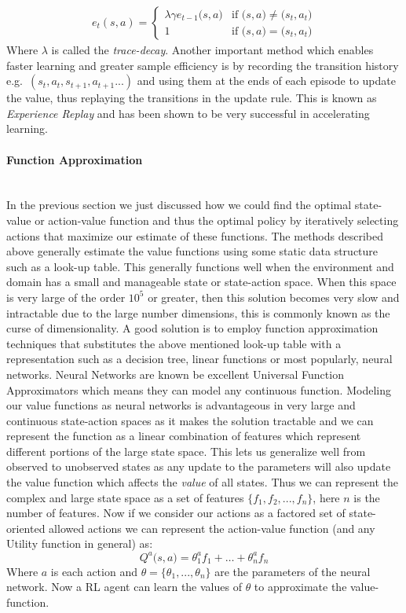 \documentclass[12pt]{extarticle}
\newcommand{\myparagraph}[1]{\paragraph{#1}\mbox{}\\ \linebreak}
\numberwithin{equation}{section}
\begin{document}
	\begin{align}
	e_t(s,a) = \begin{cases}
	\lambda\gamma e_{t-1}\big(s,a\big) & \text{if }\big(s,a\big) \neq \big(s_t,a_t\big) \\    
	1 & \text{if }\big(s,a\big) = \big(s_t,a_t\big)
	\end{cases}
	\end{align}
	Where $\lambda$ is called the \textit{trace-decay}.
	Another important method which enables faster learning and greater sample efficiency is by recording the transition history e.g.\ $(s_t,a_t,s_{t+1},a_{t+1}...)$ and using them at the ends of each episode to update the value, thus replaying the transitions in the update rule. This is known as \textit{Experience Replay} and has been shown to be very successful in accelerating learning\cite{adam2012experience}.
	
	\myparagraph{Function Approximation} \label{fn_aprrox}
	In the previous section we just discussed how we could find the optimal state-value or action-value function and thus the optimal policy by iteratively selecting actions that maximize our estimate of these functions.  The methods described above generally estimate the value functions using some static data structure such as a look-up table. This generally functions well when the environment and domain has a small and manageable state or state-action space.  When this space is very large of the order $10^5$ or greater, then this solution becomes very slow and intractable due to the large number dimensions, this is commonly known as the curse of dimensionality\cite{verleysen2005curse}. A good solution is to employ function approximation techniques that substitutes the above mentioned look-up table with a representation such as a decision tree, linear functions or most popularly, neural networks. Neural Networks are known be excellent Universal Function Approximators \cite{hornik1989multilayer} which means they can model any continuous function. Modeling our value functions as neural networks is advantageous in very large and continuous state-action spaces as it makes the solution tractable and we can represent the function as a linear combination of features which represent different portions of the large state space. This lets us generalize well from observed to unobserved states as any update to the parameters will also update the value function which affects the \textit{value} of all states. Thus we can represent the complex and large state space as a set of features $\{f_1,f_2,...,f_n\}$, here $n$ is the number of features. Now if we consider our actions as a factored set of state-oriented allowed actions we can represent the action-value function (and any Utility function in general) as: 
	\begin{equation}
	Q^a\big(s,a\big) = {\theta_1^a}f_1+\dots+{\theta_n^a}f_n
	\end{equation}		
	Where $a$ is each action and $\theta = \{\theta_1,...,\theta_n\}$ are the parameters of the neural network. Now a RL agent can learn the values of $\theta$ to approximate the value-function. 
	
\end{document}
